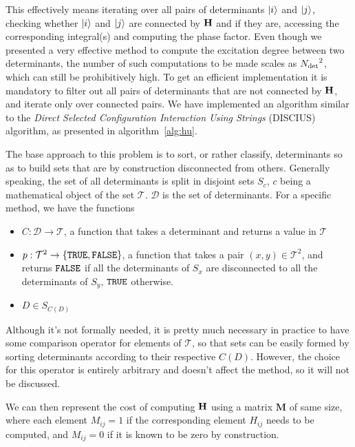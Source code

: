 \documentclass[./thesis.tex]{subfiles}
\begin{document}
This effectively means iterating over all pairs of determinants ${\ket{i}}$ and
${\ket{j}}$, checking whether ${\ket{i}}$ and ${\ket{j}}$ are connected by $\mathbf{H}$ and if they are,
accessing the corresponding integral(s) and computing the phase factor.  Even
though we presented a very effective method to compute the excitation degree
between two determinants, the number of such computations to be made scales as
${N_\text{det}}^2$, which can still be prohibitively high. To get an efficient
implementation it is mandatory to filter out all pairs of determinants that are
not connected by $\mathbf{H}$, and iterate only over connected pairs.  We have
implemented an algorithm similar to the \emph{Direct Selected Configuration
Interaction Using Strings} (DISCIUS) algorithm,\cite{Povill_1995} as presented
in algorithm~\ref{alg:hu}.




The base approach to this problem is to sort, or rather classify, determinants so as to build sets that are by construction disconnected from others. Generally speaking, the set of all determinants is split in disjoint sets $S_c$, $c$ being a mathematical object of the set $\mathcal{T}$. $\mathcal{D}$ is the set of determinants. For a specific method, we have the functions
\begin{itemize}
	\item
	$C : \mathcal{D} \rightarrow \mathcal{T}$, a function that takes a determinant and returns a value in $\mathcal{T}$
	\item
	$p : \mathcal{T}^2 \rightarrow \{ {\text{\texttt{TRUE}}}, {\text{\texttt{FALSE}}} \}$, a function that takes a pair $(x,y) \in \mathcal{T}^2$, and returns ${\text{\texttt{FALSE}}}$ if all the determinants of $S_x$ are disconnected to all the determinants of $S_y$, ${\text{\texttt{TRUE}}}$ otherwise.
	\item
	$D \in S_{C(D)}$
\end{itemize}  


Although it's not formally needed, it is pretty much necessary in practice to have some comparison operator for elements of $\mathcal{T}$, so that sets can be easily formed by sorting determinants according to their respective $C(D)$. However, the choice for this operator is entirely arbitrary and doesn't affect the method, so it will not be discussed.
    
    
We can then represent the cost of computing $\mathbf{H}$ using a matrix $\mathbf{M}$ of same size, where each element $M_{ij}=1$ if the corresponding element $H_{ij}$ needs to be computed, and $M_{ij}=0$ if it is known to be zero by construction.
\end{document}
